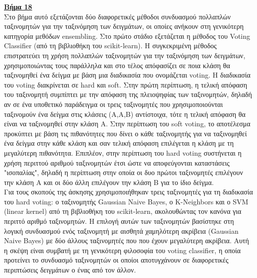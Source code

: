 \documentclass[11pt]{article} %
\begin{document}
\underline{\textbf{Βήμα 18}}\\

Στο βήμα αυτό εξετάζονται δύο διαφορετικές μέθοδοι συνδυασμού πολλαπλών ταξινομητών για την ταξινόμηση των δειγμάτων, οι οποίες ανήκουν στη γενικότερη κατηγορία μεθόδων ensembling. Στο πρώτο στάδιο εξετάζεται η μέθοδος του Voting Classifier (από τη βιβλιοθήκη του scikit-learn). Η συγκεκριμένη μέθοδος επιστρατεύει τη χρήση πολλαπλών ταξινομητών για την ταξινόμηση των δειγμάτων, χρησιμοποιώντας τους παράλληλα και στο τέλος απόφασίζει σε ποια κλάση θα ταξινομηθεί ένα δείγμα με βάση μια διαδικασία που ονομάζεται voting. Η διαδικασία του voting διακρίνεται σε hard και soft. Στην πρώτη περίπτωση, η τελική απόφαση του ταξινομητή συμπίπτει με την απόφαση της πλειοψηφίας των ταξινομητών, δηλαδή αν σε ένα υποθετικό παράδειγμα οι τρεις ταξινομητές που χρησιμοποιούνται ταξινομούν ένα δείγμα στις κλάσεις (Α,Α,Β) αντίστοιχα, τότε η τελική απόφαση θα είναι να ταξινομηθεί στην κλάση Α. Στην περίπτωση του soft voting, το αποτέλεσμα προκύπτει με βάση τις πιθανότητες που δίνει ο κάθε ταξινομητής για να ταξινομηθεί ένα δείγμα στην κάθε κλάση και σαν τελική απόφαση επιλέγεται η κλάση με τη μεγαλύτερη πιθανότητα. Επιπλέον, στην περίπτωση του hard voting συστήνεται η χρήση περιττού αριθμού ταξινομητών έτσι ώστε να αποφεύγονται καταστάσεις "ισοπαλίας", δηλαδή η περίπτωση στην οποία οι δυο πρώτοι ταξινομητές επιλέγουν την κλάση Α και οι δύο άλλη επιλέγουν την κλάση Β για το ίδιο δείγμα. \\

Για τους σκοπούς της άσκησης χρησιμοποιήθηκαν τρεις ταξινομητές για τη διαδικασία του hard voting: ο ταξινομητής Gaussian Naive Bayes, ο K-Neighbors και ο SVM (linear kernel) από τη βιβλιοθήκη του scikit-learn, ακολουθώντας τον κανόνα για περιττό αριθμό ταξινομητών. Η επιλογή αυτών των ταξινομητών βασίστηκε στη λογική συνδυασμού ενός ταξινομητή με αισθητά χαμηλότερη ακρίβεια (Gaussian Naive Bayes) με δύο άλλους ταξινομητές που που έχουν μεγαλύτερη ακρίβεια. Αυτή η σκέψη είναι συμβατή με τη γενικότερη φιλοσοφία του voting classifier, η οποία προτείνει το συνδυασμό ταξινομητών οι οποίοι αποτυγχάνουν σε διαφορετικές περιπτώσεις δειγμάτων ο ένας από τον άλλον.\\
\end{document}
